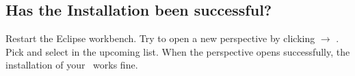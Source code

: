\subsection{Has the Installation been successful?} 
Restart the Eclipse workbench. Try to open a new perspective by clicking  $\rightarrow$ . Pick  and select  in the upcoming list.
When the perspective opens successfully, the installation of your \cjdt ~works fine.

